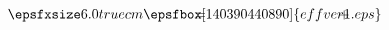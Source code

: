 \begin{equation}
\qquad \smash{\epsfxsize6.0truecm\epsfbox[140 390 440 890]{effver1.eps}}
\hspace*{-4.8cm} =
\hspace*{3.25cm} +
\qquad\qquad\qquad\quad
\end{equation}

